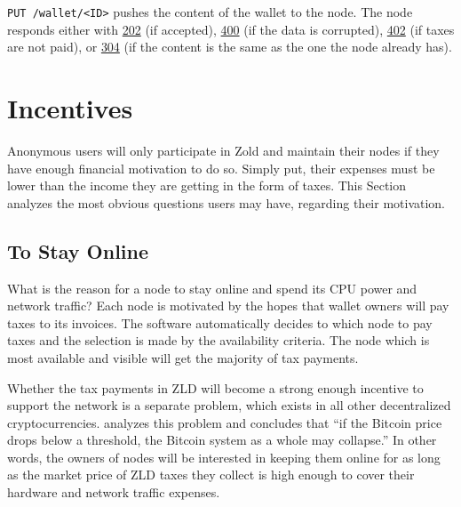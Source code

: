 \documentclass[11pt,oneside]{article}
\newcommand\dd[1]{\colorbox{gray!30}{\texttt{#1}}}
\begin{document}
\dd{PUT /wallet/<ID>} pushes the content of the wallet to the node. The
node responds either with
\href{https://www.w3.org/Protocols/rfc2616/rfc2616-sec10.html#sec10.2.3}{202} (if accepted),
\href{https://www.w3.org/Protocols/rfc2616/rfc2616-sec10.html#sec10.4.1}{400} (if the data is corrupted),
\href{https://www.w3.org/Protocols/rfc2616/rfc2616-sec10.html#sec10.4.3}{402} (if taxes are not paid),
or
\href{https://www.w3.org/Protocols/rfc2616/rfc2616-sec10.html#sec10.3.5}{304}
(if the content is the same as the one the node already has).

\section{Incentives}\label{sec:incentives}

Anonymous users will only participate in Zold and maintain
their nodes if they have enough financial motivation to do so. Simply
put, their expenses must be lower than the income they are getting in
the form of taxes. This Section analyzes the most obvious questions users
may have, regarding their motivation.

\subsection{To Stay Online}

What is the reason for a node to stay online and spend its CPU power
and network traffic? Each node is motivated by the
hopes that wallet owners will pay taxes to its invoices. The software
automatically decides to which node to pay taxes and the selection is
made by the availability criteria. The node which is most available
and visible will get the majority of tax payments.

Whether the tax payments in ZLD will become a strong enough incentive
to support the network is a separate problem, which exists in all
other decentralized cryptocurrencies. \textcite{iwamura2014} analyzes this
problem and concludes that ``if the Bitcoin price drops below
a threshold, the Bitcoin system as a whole may collapse.'' In other words,
the owners of nodes will be interested in keeping them online for as long
as the market price of ZLD taxes they collect is high enough to cover
their hardware and network traffic expenses.
\end{document}
